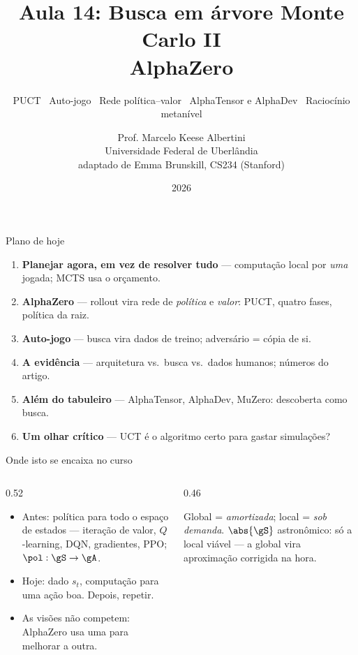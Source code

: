 \documentclass[aspectratio=169, 10pt]{beamer}
\title[Aula 14 — MCTS II: AlphaZero]{Aula 14: Busca em árvore Monte Carlo II\\ AlphaZero}
\subtitle[Aprendizagem por Reforço]{PUCT \textbullet\ Auto-jogo \textbullet\ Rede política--valor \textbullet\ AlphaTensor e AlphaDev \textbullet\ Raciocínio metanível}
\author[Prof. Marcelo K. Albertini]{Prof. Marcelo Keese Albertini \\
  \footnotesize Universidade Federal de Uberlândia \\
  \footnotesize adaptado de Emma Brunskill, CS234 (Stanford)}
\institute{Universidade Federal de Uberlândia}
\date{2026}
\begin{document}
\begin{frame}\titlepage\end{frame}

\begin{frame}{Plano de hoje}
  \begin{enumerate}\setlength{\itemsep}{0.35em}
    \item \textbf{Planejar agora, em vez de resolver tudo} — computação local por \emph{uma} jogada; MCTS usa o orçamento.
    \item \textbf{AlphaZero} — rollout vira rede de \emph{política} e \emph{valor}: PUCT, quatro fases, política da raiz.
    \item \textbf{Auto-jogo} — busca vira dados de treino; adversário = cópia de si.
    \item \textbf{A evidência} — arquitetura vs.\ busca vs.\ dados humanos; números do artigo.
    \item \textbf{Além do tabuleiro} — AlphaTensor, AlphaDev, MuZero: descoberta como busca.
    \item \textbf{Um olhar crítico} — UCT é o algoritmo certo para gastar simulações?
  \end{enumerate}
\end{frame}

\begin{frame}{Onde isto se encaixa no curso}
  \begin{columns}[T]
    \begin{column}{0.52\textwidth}
      \small
      \begin{itemize}
        \item Antes: política \alert{para todo} o espaço de estados — iteração de valor, $Q$-learning, DQN, gradientes, PPO; $\pol : \gS \to \gA$.
        \item Hoje: dado $s_t$, computação para \alert{uma} ação boa. Depois, repetir.
        \item As visões não competem: AlphaZero usa uma para melhorar a outra.
      \end{itemize}
    \end{column}
    \begin{column}{0.46\textwidth}
      \begin{ideiabox}
        Global = \emph{amortizada}; local = \emph{sob demanda}. $\abs{\gS}$ astronômico: só a local viável — a global vira aproximação corrigida na hora.
      \end{ideiabox}
    \end{column}
  \end{columns}
\end{frame}
\end{document}
